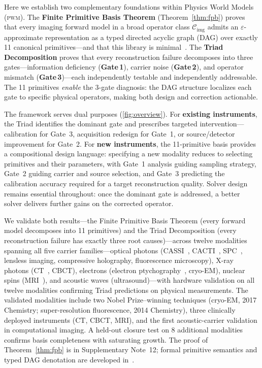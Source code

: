 \documentclass[11pt]{article}
\newcommand{\ctier}{\mathcal{C}_{\mathrm{img}}}
\newcommand{\pwm}{\textsc{pwm}}
\newcommand{\gateone}{\textbf{Gate\,1}}
\newcommand{\gatetwo}{\textbf{Gate\,2}}
\newcommand{\gatethree}{\textbf{Gate\,3}}
\begin{document}
Here we establish two complementary foundations within Physics World Models (\pwm{}). The \textbf{Finite Primitive Basis Theorem} (Theorem~\ref{thm:fpb}) proves that every imaging forward model in a broad operator class $\ctier$ admits an $\varepsilon$-approximate representation as a typed directed acyclic graph (DAG) over exactly 11 canonical primitives---and that this library is minimal~\cite{yang2026fpt}. The \textbf{Triad Decomposition} proves that every reconstruction failure decomposes into three gates---information deficiency (\gateone{}), carrier noise (\gatetwo{}), and operator mismatch (\gatethree{})---each independently testable and independently addressable. The 11 primitives \emph{enable} the 3-gate diagnosis: the DAG structure localizes each gate to specific physical operators, making both design and correction actionable.

The framework serves dual purposes (\cref{fig:overview}). For \textbf{existing instruments}, the Triad identifies the dominant gate and prescribes targeted intervention---calibration for Gate~3, acquisition redesign for Gate~1, or source/detector improvement for Gate~2. For \textbf{new instruments}, the 11-primitive basis provides a compositional design language: specifying a new modality reduces to selecting primitives and their parameters, with Gate~1 analysis guiding sampling strategy, Gate~2 guiding carrier and source selection, and Gate~3 predicting the calibration accuracy required for a target reconstruction quality. Solver design remains essential throughout: once the dominant gate is addressed, a better solver delivers further gains on the corrected operator.

\begin{sloppypar}
We validate both results---the Finite Primitive Basis Theorem (every forward model decomposes into 11 primitives) and the Triad Decomposition (every reconstruction failure has exactly three root causes)---across twelve modalities spanning all five carrier families---optical photons (CASSI~\cite{wagadarikar2008cassi}, CACTI~\cite{llull2013cacti}, SPC~\cite{duarte2008spc}, lensless imaging, compressive holography, fluorescence microscopy), X-ray photons (CT~\cite{feldkamp1984practical}, CBCT), electrons (electron ptychography~\cite{rodenburg2004ptychography}, cryo-EM), nuclear spins (MRI~\cite{pruessmann1999sense,lustig2007sparse}), and acoustic waves (ultrasound)---with hardware validation on all twelve modalities confirming Triad predictions on physical measurements. The validated modalities include two Nobel Prize--winning techniques (cryo-EM, 2017 Chemistry; super-resolution fluorescence, 2014 Chemistry), three clinically deployed instruments (CT, CBCT, MRI), and the first acoustic-carrier validation in computational imaging. A held-out closure test on 8 additional modalities confirms basis completeness with saturating growth. The proof of Theorem~\ref{thm:fpb} is in Supplementary Note~12; formal primitive semantics and typed DAG denotation are developed in~\cite{yang2026fpt}.
\end{sloppypar}
\end{document}
